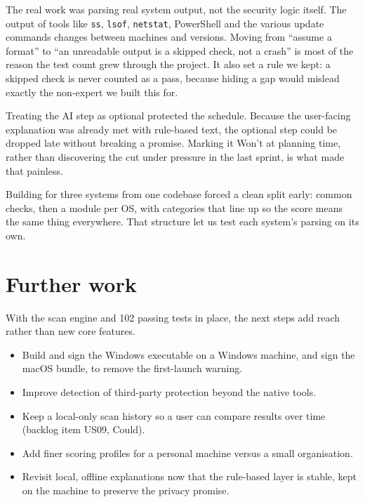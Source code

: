 \documentclass[11pt,a4paper]{article}
\begin{document}
The real work was parsing real system output, not the security logic itself. The
output of tools like \texttt{ss}, \texttt{lsof}, \texttt{netstat}, PowerShell and
the various update commands changes between machines and versions. Moving from
``assume a format'' to ``an unreadable output is a skipped check, not a crash''
is most of the reason the test count grew through the project. It also set a rule
we kept: a skipped check is never counted as a pass, because hiding a gap would
mislead exactly the non-expert we built this for.

Treating the AI step as optional protected the schedule. Because the user-facing
explanation was already met with rule-based text, the optional step could be
dropped late without breaking a promise. Marking it Won't at planning time,
rather than discovering the cut under pressure in the last sprint, is what made
that painless.

Building for three systems from one codebase forced a clean split early: common
checks, then a module per OS, with categories that line up so the score means the
same thing everywhere. That structure let us test each system's parsing on its own.

\section{Further work}

With the scan engine and 102 passing tests in place, the next steps add reach
rather than new core features.

\begin{itemize}
\item Build and sign the Windows executable on a Windows machine, and sign the
  macOS bundle, to remove the first-launch warning.
\item Improve detection of third-party protection beyond the native tools.
\item Keep a local-only scan history so a user can compare results over time
  (backlog item US09, Could).
\item Add finer scoring profiles for a personal machine versus a small
  organisation.
\item Revisit local, offline explanations now that the rule-based layer is
  stable, kept on the machine to preserve the privacy promise.
\end{itemize}
\end{document}
